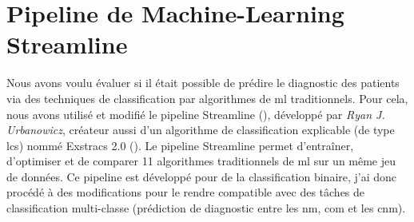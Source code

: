 \section{Pipeline de Machine-Learning Streamline}
Nous avons voulu évaluer si il était possible de prédire le diagnostic des patients via des techniques de classification par algorithmes de \gls{ml} traditionnels. Pour cela, nous avons utilisé et modifié le pipeline Streamline (\cite{urbanowicz_streamline_2022}), développé par \textit{Ryan J. Urbanowicz}, créateur aussi d'un algorithme de classification explicable (de type \gls{lcs})  nommé Exstracs 2.0 (\cite{urbanowicz_exstracs_2015}).
Le pipeline Streamline permet d'entraîner, d'optimiser et de comparer 11 algorithmes traditionnels de \gls{ml} sur un même jeu de données. Ce pipeline est développé pour de la classification binaire, j'ai donc procédé à des modifications pour le rendre compatible avec des tâches de classification multi-classe (prédiction de diagnostic entre les \gls{nm}, \gls{com} et les \gls{cnm}).
